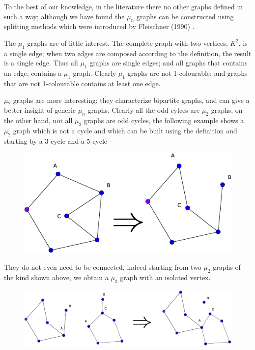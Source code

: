 \documentclass[a4paper,12pt,oneside]{book}
\begin{document}
To the best of our knowledge, in the literature there no other graphs defined in such a way; although we have found the $\mu_n$ graphs can be constructed using splitting methods which were introduced by Fleischner (1990) \cite{split}.

The $\mu_1$ graphs are of little interest. The complete graph with two vertices, $K^2$, is a single edge; when two edges are composed according to the definition, the result is a single edge. Thus all $	\mu_1$ graphs are single edges; and all graphs that contains  an edge, contains a $\mu_1$ graph. Clearly $\mu_1$ graphs are not 1-colourable; and graphs that are not 1-colourable contains at least one edge.

$\mu_2$ graphs are more interesting; they characterize bipartite graphs, and can give a better insight of generic $\mu_n$ graphs. Clearly all the odd cylces are $\mu_2$ graphs; on the other hand, not all $\mu_2$ graphs are odd cycles, the following example shows a $\mu_2$ graph which is not a cycle and which can be built using the definition and starting by a 3-cycle and a 5-cycle 
\begin{figure}[h]
\centering\includegraphics[scale=0.25]{mu2.eps}
\end{figure}

\noindent They do not even need to be connected, indeed starting from two $\mu_2$ graphs of the kind shown above, we obtain a $\mu_2$ graph with an isolated vertex.

\begin{figure}[h]
\centering\includegraphics[scale=0.25]{mu2-con1.eps}
\end{figure}
\end{document}
